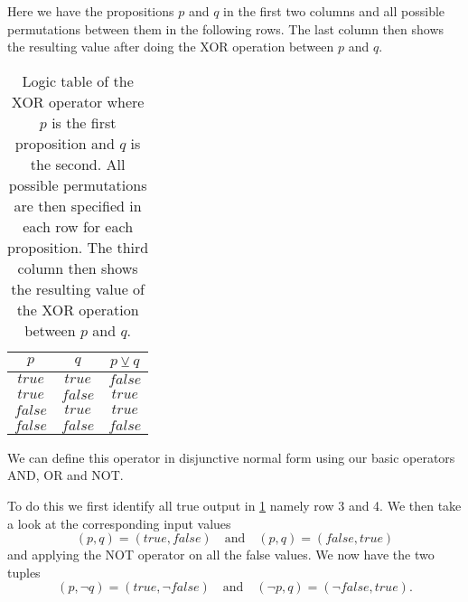                 Here we have the propositions $p$ and $q$ in the first two columns and all possible permutations between them in the following rows. The last column then shows the resulting value after doing the XOR operation between $p$ and $q$.
                
                \begin{table}[h!]
                    \centering
                    \begin{tabular}{|c|c|c|}
                    	\hline
                    	  $p$   &   $q$   & $p \veebar q$ \\ \hline
                    	$true$  & $true$  &    $false$    \\ \hline
                    	$true$  & $false$ &    $true$     \\ \hline
                    	$false$ & $true$  &    $true$     \\ \hline
                    	$false$ & $false$ &    $false$    \\ \hline
                    \end{tabular}
                    \caption{Logic table of the XOR operator where $p$ is the first proposition and $q$ is the second. All possible permutations are then specified in each row for each proposition. The third column then shows the resulting value of the XOR operation between $p$ and $q$.}
                    \label{LogicTable:XOR}
                \end{table}
            
                We can define this operator in disjunctive normal  form using our basic operators AND, OR and NOT. 
                
                To do this we first identify all true output in \ref{LogicTable:XOR} namely row 3 and 4. We then take a look at the corresponding input values
                \begin{equation}
                    (p,q) = (true, false) \quad \text{and} \quad (p,q) = (false, true)
                \end{equation}
                and applying the NOT operator on all the false values. We now have the two tuples
                \begin{equation}
                    (p,\neg q) = (true, \neg false) \quad \text{and} \quad (\neg p, q) = (\neg false, true).
                \end{equation}
                
